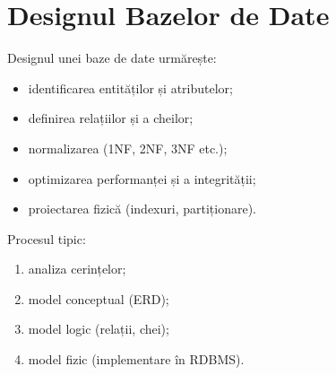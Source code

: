 \documentclass[12pt,a4paper]{article}
\begin{document}
\section{Designul Bazelor de Date}
Designul unei baze de date urmărește:
\begin{itemize}[noitemsep]
    \item identificarea entităților și atributelor;
    \item definirea relațiilor și a cheilor;
    \item normalizarea (1NF, 2NF, 3NF etc.);
    \item optimizarea performanței și a integrității;
    \item proiectarea fizică (indexuri, partiționare).
\end{itemize}

Procesul tipic:
\begin{enumerate}[noitemsep]
    \item analiza cerințelor;
    \item model conceptual (ERD);
    \item model logic (relații, chei);
    \item model fizic (implementare în RDBMS).
\end{enumerate}
\end{document}
